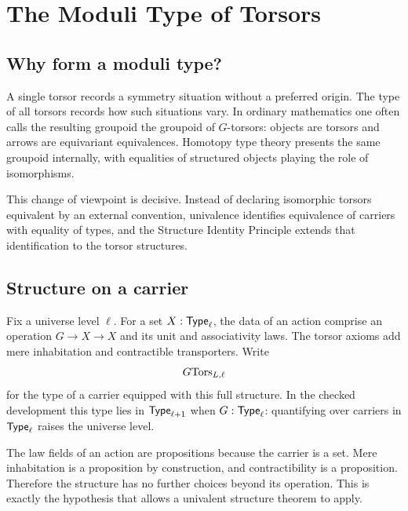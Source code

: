 \section{The Moduli Type of Torsors}
\label{ch:moduli}

\subsection{Why form a moduli type?}
A single torsor records a symmetry situation without a preferred origin. The type of all torsors records how such situations vary. In ordinary mathematics one often calls the resulting groupoid the groupoid of $G$-torsors: objects are torsors and arrows are equivariant equivalences. Homotopy type theory presents the same groupoid internally, with equalities of structured objects playing the role of isomorphisms.

This change of viewpoint is decisive. Instead of declaring isomorphic torsors equivalent by an external convention, univalence identifies equivalence of carriers with equality of types, and the Structure Identity Principle extends that identification to the torsor structures.

\subsection{Structure on a carrier}
Fix a universe level $\ell$. For a set $X: \mathsf{Type}_\ell$, the data of an action comprise an operation $G\to X\to X$ and its unit and associativity laws. The torsor axioms add mere inhabitation and contractible transporters. Write
\begin{equation}
G\mathrm{Tors}_{L,\ell}
\end{equation}
for the type of a carrier equipped with this full structure. In the checked development this type lies in $\mathsf{Type}_{\ell+1}$ when $G: \mathsf{Type}_\ell$: quantifying over carriers in $\mathsf{Type}_\ell$ raises the universe level.

\begin{remark}
The law fields of an action are propositions because the carrier is a set. Mere inhabitation is a proposition by construction, and contractibility is a proposition. Therefore the structure has no further choices beyond its operation. This is exactly the hypothesis that allows a univalent structure theorem to apply.
\end{remark}


